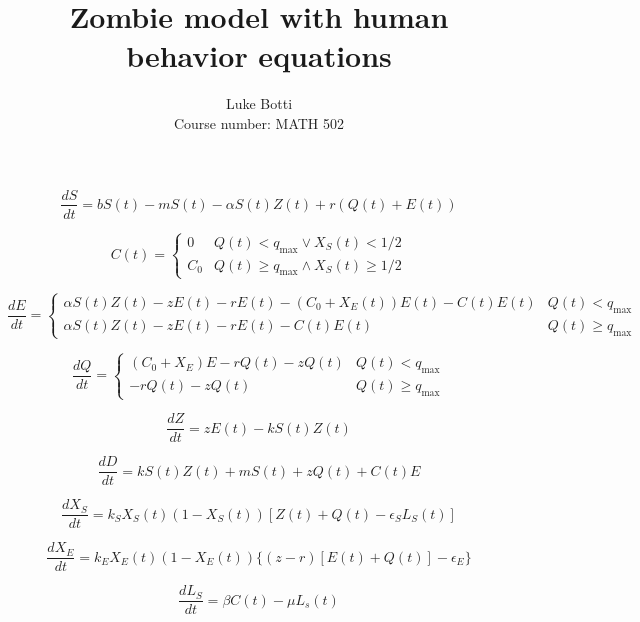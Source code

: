 \documentclass[12pt]{article}
\begin{document}
 
\title{Zombie model with human behavior equations}
\author{Luke Botti\\
Course number: MATH 502}
\maketitle
 
$$\frac{dS}{dt} = bS(t) - mS(t) -\alpha S(t)Z(t) + r(Q(t)+E(t))$$

$$C(t) = \begin{cases}
	0 & Q(t) < q_{\text{max}} \vee X_S(t) < 1/2 \\
	C_0 & Q(t) \geq q_{\text{max}} \wedge X_S(t) \geq 1/2
\end{cases}$$

$$\frac{dE}{dt} = \begin{cases} 
      \alpha S(t)Z(t) - zE(t) -rE(t) - (C_0 + X_E(t))E(t) - C(t) E(t) & Q(t) < q_{\text{max}} \\
      \alpha S(t)Z(t) - zE(t) -rE(t) - C(t) E(t) & Q(t) \geq q_{\text{max}}
   \end{cases}
$$

$$\frac{dQ}{dt} = \begin{cases}
	(C_0 + X_E)E - rQ(t) - zQ(t) & Q(t) < q_{\text{max}}\\
	-rQ(t) - zQ(t) & Q(t) \geq q_{\text{max}}
\end{cases}$$

$$\frac{dZ}{dt} = zE(t) -kS(t)Z(t)$$

$$\frac{dD}{dt} = kS(t)Z(t) + mS(t) + zQ(t) + C(t)E$$

$$\frac{dX_S}{dt} = k_S X_S(t) (1 - X_S(t))[Z(t) + Q(t) - \epsilon_S L_S(t)]$$

$$\frac{dX_E}{dt} = k_E X_E(t) (1 - X_E(t))\{(z-r)[E(t) + Q(t)] - \epsilon_E\}$$

$$\frac{dL_S}{dt} = \beta C(t) - \mu L_s(t)$$
\end{document}
